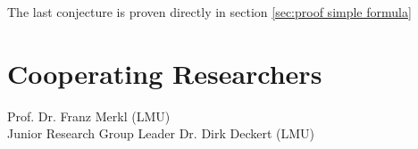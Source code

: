 \documentclass[b5paper,draft,openbib,12pt]{memoir}
\begin{document}
The last conjecture is proven directly in section \ref{sec:proof simple formula}







%
%

\chapter{Cooperating Researchers} 
Prof. Dr. Franz Merkl (LMU)\\
Junior Research Group Leader Dr. Dirk Deckert (LMU)
\end{document}
